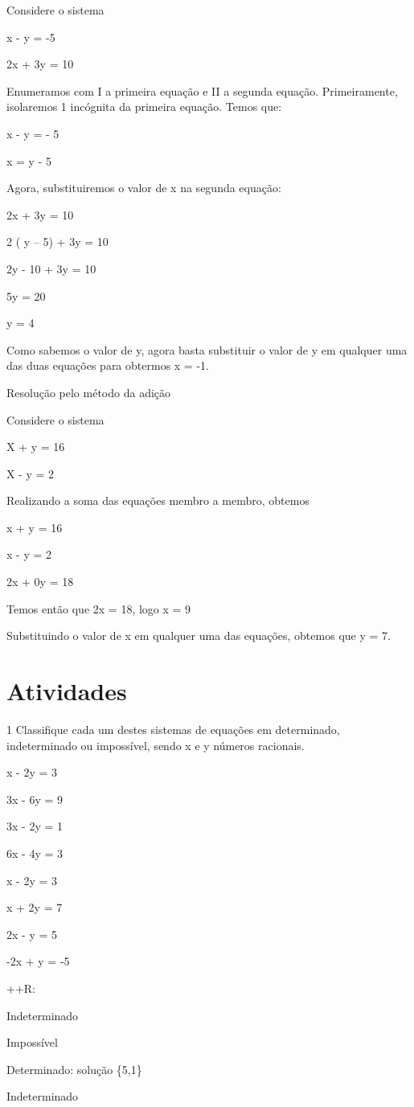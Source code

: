 {Considere o sistema

x - y = -5

2x + 3y = 10

Enumeramos com I a primeira equação e II a segunda equação.
Primeiramente, isolaremos 1 incógnita da primeira equação. Temos que:

x - y = - 5

x = y - 5

Agora, substituiremos o valor de x na segunda equação:

2x + 3y = 10

2 ( y -- 5) + 3y = 10

2y - 10 + 3y = 10

5y = 20

y = 4

Como sabemos o valor de y, agora basta substituir o valor de y em
qualquer uma das duas equações para obtermos x = -1.

Resolução pelo método da adição

Considere o sistema

X + y = 16

X - y = 2

Realizando a soma das equações membro a membro, obtemos

x + y = 16

x - y = 2

2x + 0y = 18

Temos então que 2x = 18, logo x = 9

Substituindo o valor de x em qualquer uma das equações, obtemos que y =
7.

\section{Atividades}

\num{1} Classifique cada um destes sistemas de equações em determinado,
indeterminado ou impossível, sendo x e y números racionais.
\item x - 2y = 3

3x - 6y = 9
\item 3x - 2y = 1

6x - 4y = 3
\item x - 2y = 3

x + 2y = 7
\item 2x - y = 5

-2x + y = -5

++R:
\item Indeterminado
\item Impossível
\item Determinado: solução \{5,1\}
\item Indeterminado

}
